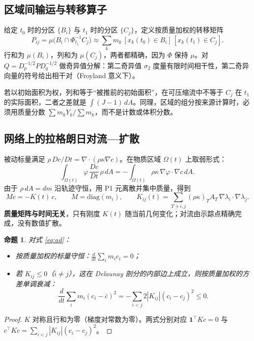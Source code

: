 \documentclass[10.5pt,a4paper]{article}
\newtheorem{prop}{命题}\renewcommand{\proofname}{证明}
\begin{document}
\subsection{区域间输运与转移算子}
给定 $t_0$ 时的分区 $\{B_i\}$ 与 $t_1$ 时的分区 $\{C_j\}$，定义按质量加权的转移矩阵
\begin{equation}
P_{ij}=\mu\big(B_i\cap\Phi_{t_1}^{-1}C_j\big)\approx\sum_k m_k\,[x_k(t_0)\in B_i]\,[x_k(t_1)\in C_j].
\end{equation}
行和为 $\mu(B_i)$，列和为 $\mu(C_j)$，两者都精确，因为 $\Phi$ 保持 $\mu$。对 $Q=D_p^{-1/2}PD_q^{-1/2}$ 做奇异值分解：第二奇异值 $\sigma_2$ 度量有限时间相干性，第二奇异向量的符号给出相干对（Froyland 意义下）。

若以初始面积为权，列和等于“被推前的初始面积”，在可压缩流中不等于 $C_j$ 在 $t_1$ 的实际面积，二者之差就是 $\int(J-1)\,dA$。同理，区域的组分按来源计算时，必须用质量分数 $\sum m_kY_k/\sum m_k$，而不是计数或体积分数。

\subsection{网络上的拉格朗日对流—扩散}
被动标量满足 $\rho\,Dc/Dt=\nabla\!\cdot(\rho\kappa\nabla c)$。在物质区域 $\Omega(t)$ 上取弱形式：
\begin{equation}
\int_{\Omega(t)}\varphi\,\frac{Dc}{Dt}\,\rho\,dA=-\int_{\Omega(t)}\rho\kappa\,\nabla\varphi\cdot\nabla c\,dA .
\end{equation}
由于 $\rho\,dA=dm$ 沿轨迹守恒，用 P1 元离散并集中质量，得到
\begin{equation}
M\dot c=-K(t)\,c,\qquad M=\mathrm{diag}(m_i),\qquad K_{ij}(t)=\sum_{T\ni i,j}(\rho\kappa)_TA_T\,\nabla\lambda_i\cdot\nabla\lambda_j .\label{eq:ad}
\end{equation}
\textbf{质量矩阵与时间无关}，只有刚度 $K(t)$ 随当前几何变化；对流由示踪点精确完成，没有数值扩散。
\begin{prop}
对式 \eqref{eq:ad}：
\begin{itemize}
\item 按质量加权的标量守恒：$\frac{d}{dt}\sum_im_ic_i=0$；
\item 若 $K_{ij}\le0$（$i\ne j$），这在 Delaunay 剖分的内部边上成立，则按质量加权的方差单调衰减：
\[
\frac{d}{dt}\sum_im_i(c_i-\bar c)^2=-\sum_{i<j}2|K_{ij}|(c_i-c_j)^2\le0 .
\]
\end{itemize}
\end{prop}
\begin{proof}
$K$ 对称且行和为零（梯度对常数为零）。两式分别对应 $\mathbf 1^\top Kc=0$ 与 $c^\top Kc=\sum_{i<j}|K_{ij}|(c_i-c_j)^2$。
\end{proof}
\end{document}
